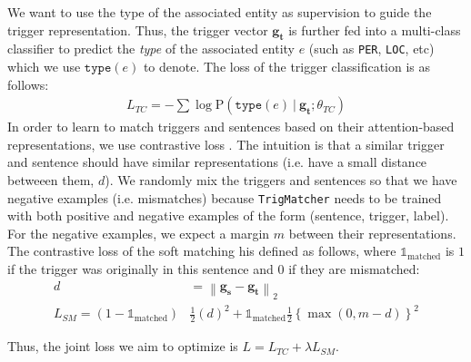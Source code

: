 We want to use the type of the associated entity as supervision to guide the trigger representation.
Thus, the trigger vector $\mathbf{g_t}$ is further fed into a multi-class classifier to predict the \textit{type} of the associated entity $e$ (such as \texttt{PER}, \texttt{LOC}, etc) which we use $\texttt{type}(e)$ to denote.
The loss of the trigger classification is as follows:
{
	{
		\begin{align*} 
		L_{TC}=-\sum \log \mathrm{P} \left(\texttt{type}(e)~|~ \mathbf{g_t}; \theta_{TC}\right) %
		\end{align*} 
	}
}  
In order to learn to match triggers and sentences based on their attention-based representations, we use contrastive loss \cite{hadsell2006dimensionality}.
The intuition is that a similar trigger and sentence should have similar representations (i.e. have a small distance betweeen them, $d$).
We randomly mix the triggers and sentences so that we have negative examples (i.e. mismatches) because \texttt{TrigMatcher} needs to be trained with both positive and negative examples of the form (sentence, trigger, label). For the negative examples, we expect a margin $m$ between their representations. The contrastive loss of the soft matching his defined as follows, where $\mathds{1}_{\text{matched}}$ is $1$ if the trigger was originally in this sentence and $0$ if they are mismatched:
{
	{
		\begin{align*}  
		d&=\left\|\mathbf{g_s}-\mathbf{g_t}\right\|_{2}\\
			L_{SM} = (1-\mathds{1}_{\text{matched}}) &\frac{1}{2}\left(d\right)^{2}+\mathds{1}_{\text{matched}} \frac{1}{2}\left\{\max \left(0, m-d\right)\right\}^{2}
		\end{align*} 
	}
}  

Thus, the joint loss we aim to optimize is $L = L_{TC} + \lambda L_{SM}$. %



